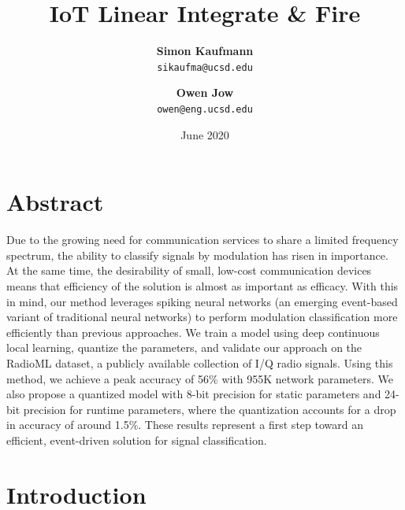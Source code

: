 \documentclass[parskip=true, 10pt]{scrartcl}
\title{\vspace{-1cm}IoT Linear Integrate \& Fire\\\vspace{0.4cm}{Final Report}\vspace{0.5cm}}
\author{
  \textbf{\textsf{Simon Kaufmann}} \\
  \texttt{sikaufma@ucsd.edu}
  \and
 \textbf{\textsf{Owen Jow}} \\
  \texttt{owen@eng.ucsd.edu}
}
\date{June 2020}
\begin{document}
\maketitle

\tableofcontents

\section{Abstract}

Due to the growing need for communication services to share a limited frequency spectrum, the ability to classify signals by modulation has risen in importance. At the same time, the desirability of small, low-cost communication devices means that efficiency of the solution is almost as important as efficacy. With this in mind, our method leverages spiking neural networks (an emerging event-based variant of traditional neural networks) to perform modulation classification more efficiently than previous approaches. We train a model using deep continuous local learning, quantize the parameters, and validate our approach on the RadioML dataset, a publicly available collection of I/Q radio signals. Using this method, we achieve a peak accuracy of 56\% with 955K network parameters. We also propose a quantized model with 8-bit precision for static parameters and 24-bit precision for runtime parameters, where the quantization accounts for a drop in accuracy of around 1.5\%. These results represent a first step toward an efficient, event-driven solution for signal classification.



\section{Introduction}


\end{document}
